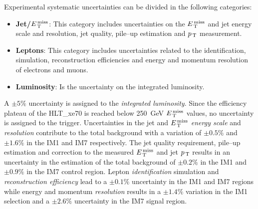 Experimental systematic uncertainties can be divided in the following
categories:
\begin{itemize}
\item \textbf{Jet/$E_\mathrm{\, T}^\mathrm{\, miss}$}: This category includes uncertainties on the $E_\mathrm{\, T}^\mathrm{\, miss}$
  and jet energy scale and resolution, jet quality, pile--up estimation and
  $p_\mathrm{\, T}$ measurement.
\item \textbf{Leptons}: This category includes uncertainties related to the
  identification, simulation, reconstruction efficiencies and energy and
  momentum resolution of electrons and muons.
\item \textbf{Luminosity}: Is the uncertainty on the integrated luminosity.
\end{itemize}
A $\pm 5\%$ uncertainty is assigned to the \emph{integrated luminosity}. Since
the efficiency plateau of the HLT\_xe70 is reached below 250~GeV $E_\mathrm{\, T}^\mathrm{\, miss}$ values,
no uncertainty is assigned to the trigger. Uncertainties in the jet and $E_\mathrm{\, T}^\mathrm{\, miss}$
\emph{energy scale} and \emph{resolution} contribute to the total background
with a variation of $\pm 0.5\%$ and $\pm 1.6\%$ in the IM1 and IM7
respectively. The jet quality requirement, pile--up estimation and correction to
the measured $E_\mathrm{\, T}^\mathrm{\, miss}$ and jet $p_\mathrm{\, T}$ results in an uncertainty in the estimation of
the total background of $\pm 0.2\%$ in the IM1 and $\pm 0.9 \%$ in the IM7
control region. Lepton \emph{identification} simulation and
\emph{reconstruction efficiency} lead to a $\pm 0.1\%$ uncertainty in the IM1
and IM7 regions while energy and momentum \emph{resolution} results in a $\pm
1.4\%$ variation in the IM1 selection and a $\pm 2.6\%$ uncertainty in the IM7
signal region.
